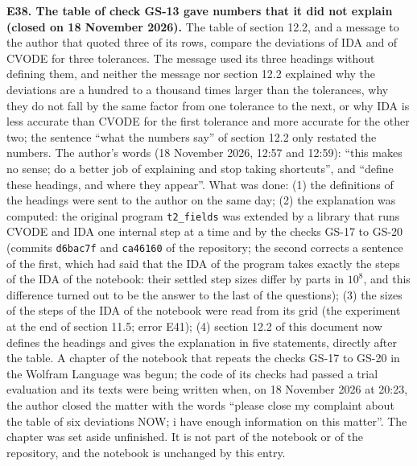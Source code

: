 \documentclass[
  10pt,
]{article}
\begin{document}
\textbf{E38. The table of check GS-13 gave numbers that it did not
explain (closed on 18 November 2026).} The table of section 12.2, and a
message to the author that quoted three of its rows, compare the
deviations of IDA and of CVODE for three tolerances. The message used
its three headings without defining them, and neither the message nor
section 12.2 explained why the deviations are a hundred to a thousand
times larger than the tolerances, why they do not fall by the same
factor from one tolerance to the next, or why IDA is less accurate than
CVODE for the first tolerance and more accurate for the other two; the
sentence ``what the numbers say'' of section 12.2 only restated the
numbers. The author's words (18 November 2026, 12:57 and 12:59): ``this
makes no sense; do a better job of explaining and stop taking
shortcuts'', and ``define these headings, and where they appear''. What
was done: (1) the definitions of the headings were sent to the author on
the same day; (2) the explanation was computed: the original program
\texttt{t2\_fields} was extended by a library that runs CVODE and IDA
one internal step at a time and by the checks GS-17 to GS-20 (commits
\texttt{d6bac7f} and \texttt{ca46160} of the repository; the second
corrects a sentence of the first, which had said that the IDA of the
program takes exactly the steps of the IDA of the notebook: their
settled step sizes differ by parts in \(10^{8}\), and this difference
turned out to be the answer to the last of the questions); (3) the sizes
of the steps of the IDA of the notebook were read from its grid (the
experiment at the end of section 11.5; error E41); (4) section 12.2 of
this document now defines the headings and gives the explanation in five
statements, directly after the table. A chapter of the notebook that
repeats the checks GS-17 to GS-20 in the Wolfram Language was begun; the
code of its checks had passed a trial evaluation and its texts were
being written when, on 18 November 2026 at 20:23, the author closed the
matter with the words ``please close my complaint about the table of six
deviations NOW; i have enough information on this matter''. The chapter
was set aside unfinished. It is not part of the notebook or of the
repository, and the notebook is unchanged by this entry.
\end{document}
